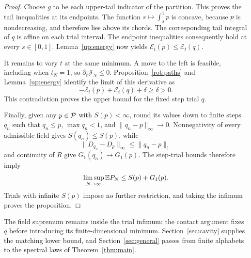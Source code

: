 \begin{proof}
Choose \(g\) to be each upper-tail indicator of the partition.
This proves the tail inequalities at its endpoints. The function
\(s\mapsto\int_s^1p\) is concave, because \(p\) is nondecreasing,
and therefore lies above its chords. The corresponding tail
integral of \(q\) is affine on each trial interval. The endpoint
inequalities consequently hold at every \(s\in[0,1]\).
Lemma~\ref{up:energy} now yields
\(\mathcal E_t(p)\le\mathcal E_t(q)\).

It remains to vary \(t\) at the same minimum.
A move to the left is feasible, including when \(t_N=1\), so
\(\partial_t\mathcal J_N\le0\). Proposition~\ref{rot:paths}
and Lemma~\ref{up:energy} identify the limit of this derivative as
\[
 -\mathcal E_t(p)+\mathcal E_t(q)+\delta\ge\delta>0.
\]
This contradiction proves the upper bound for the fixed step
trial \(q\).

Finally, given any \(p\in\mathcal P\) with \(S(p)<\infty\), round
its values down to finite steps \(q_n\) such that
\(q_n\le p\), \(\max q_n<1\), and
\(\|q_n-p\|_\infty\to0\). Nonnegativity of every admissible field
gives \(S(q_n)\le S(p)\), while
\[
 \|D_{q_n}-D_p\|_\infty\le\|q_n-p\|_1
\]
and continuity of \(R\) give \(G_1(q_n)\to G_1(p)\).
The step-trial bounds therefore imply
\[
 \limsup_{N\to\infty}\mathbb E P_N\le S(p)+G_1(p).
\]
Trials with infinite
\(S(p)\) impose no further restriction, and taking the infimum
proves the proposition.
\end{proof}

The field supremum remains inside the trial infimum: the contact
argument fixes \(q\) before introducing its finite-dimensional
minimum. Section~\ref{sec:cavity} supplies the matching lower
bound, and Section~\ref{sec:general} passes from finite alphabets
to the spectral laws of Theorem~\ref{thm:main}.
